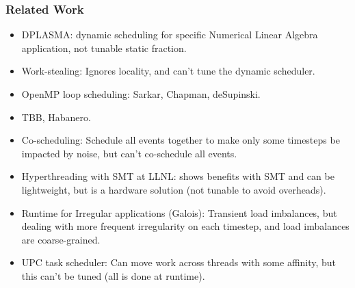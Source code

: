 \begin{frame}[label=relatedWork]
\frametitle{Related Work}
\begin{itemize}
\item \small DPLASMA: dynamic scheduling for specific Numerical Linear
  Algebra application, not tunable static fraction. 
\item \small Work-stealing: Ignores locality, and can't tune the
  dynamic scheduler. 
\item \small OpenMP loop scheduling: Sarkar, Chapman, deSupinski.
\item \small TBB, Habanero.
\item \small Co-scheduling: Schedule all events together to make only 
  some timesteps be impacted by noise, but can't co-schedule all
  events. 
\item \small Hyperthreading with SMT at LLNL: shows benefits with SMT 
  and can be lightweight, but is a hardware solution (not tunable to
  avoid overheads). 
\item \small Runtime for Irregular applications (Galois): Transient
  load imbalances, but dealing with more frequent irregularity on each
  timestep, and load imbalances are coarse-grained. 
\item \small UPC task scheduler: Can move work across threads with
  some affinity, but this can't be tuned (all is done at runtime).
\end{itemize}
\end{frame}

